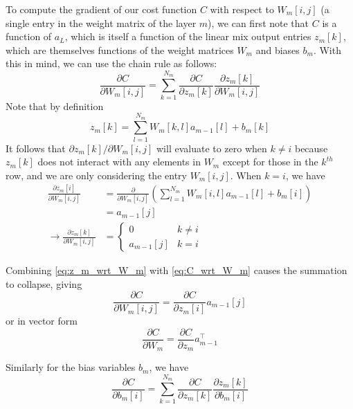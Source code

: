 To compute the gradient of our cost function $C$ with respect to $W_m[i, j]$ (a single entry in the weight matrix of the layer $m$), we can first note that $C$ is a function of $a_L$, which is itself a function of the linear mix output entries $z_m[k]$, which are themselves functions of the weight matrices $W_m$ and biases $b_m$.
With this in mind, we can use the chain rule as follows:
\begin{equation}
\frac{\partial C}{\partial W_m[i, j]} = \sum_{k = 1}^{N_m} \frac{\partial C}{\partial z_m[k]} \frac{\partial z_m[k]}{\partial W_m[i, j]}
\label{eq:C_wrt_W_m}
\end{equation}
Note that by definition
\begin{equation}
z_m[k] = \sum_{l = 1}^{N_m} W_m[k, l] a_{m - 1}[l] + b_m[k]
\end{equation}
It follows that $\partial z_m[k]/\partial W_m[i, j]$ will evaluate to zero when $k \ne i$ because $z_m[k]$ does not interact with any elements in $W_m$ except for those in the $k^{th}$ row, and we are only considering the entry $W_m[i, j]$.
When $k = i$, we have
\begin{align}
\frac{\partial z_m[i]}{\partial W_m[i, j]} &= \frac{\partial}{\partial W_m[i, j]}\left(\sum_{l = 1}^{N_m} W_m[i, l] a_{m - 1}[l] + b_m[i]\right)\\
                                           &= a_{m - 1}[j]\\
\rightarrow \frac{\partial z_m[k]}{\partial W_m[i, j]} &= \begin{cases}
0 & k \ne i\\
a_{m - 1}[j] & k = i
\end{cases}
\label{eq:z_m_wrt_W_m}
\end{align}

Combining \cref{eq:z_m_wrt_W_m} with \cref{eq:C_wrt_W_m} causes the summation to collapse, giving
\begin{equation}
        \frac{\partial C}{\partial W_m[i, j]} = \frac{\partial C}{\partial z_m[i]} a_{m - 1}[j]
\end{equation}
or in vector form
\begin{equation}
        \frac{\partial C}{\partial W_m} = \frac{\partial C}{\partial z_m} a_{m - 1}^\top
\end{equation}

Similarly for the bias variables $b_m$, we have
\begin{equation}
\frac{\partial C}{\partial b_m[i]} = \sum_{k = 1}^{N_m} \frac{\partial C}{\partial z_m[k]} \frac{\partial z_m[k]}{\partial b_m[i]}
\label{eq:C_wrt_b_m}
\end{equation}

